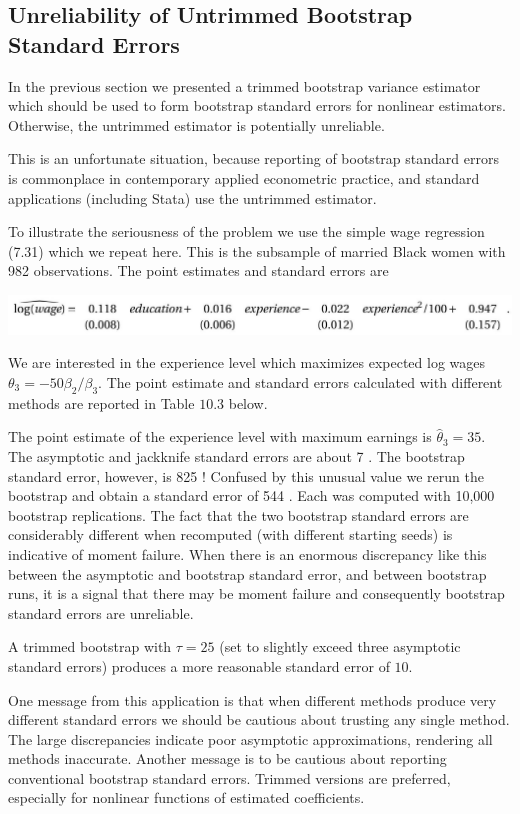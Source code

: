 \documentclass[10pt]{article}
\begin{document}
\subsection{Unreliability of Untrimmed Bootstrap Standard Errors}
In the previous section we presented a trimmed bootstrap variance estimator which should be used to form bootstrap standard errors for nonlinear estimators. Otherwise, the untrimmed estimator is potentially unreliable.

This is an unfortunate situation, because reporting of bootstrap standard errors is commonplace in contemporary applied econometric practice, and standard applications (including Stata) use the untrimmed estimator.

To illustrate the seriousness of the problem we use the simple wage regression (7.31) which we repeat here. This is the subsample of married Black women with 982 observations. The point estimates and standard errors are

\includegraphics[max width=\textwidth]{2022_09_17_704b7bd5000562ad7735g-21}

We are interested in the experience level which maximizes expected log wages $\theta_{3}=-50 \beta_{2} / \beta_{3}$. The point estimate and standard errors calculated with different methods are reported in Table $10.3$ below.

The point estimate of the experience level with maximum earnings is $\widehat{\theta}_{3}=35$. The asymptotic and jackknife standard errors are about 7 . The bootstrap standard error, however, is 825 ! Confused by this unusual value we rerun the bootstrap and obtain a standard error of 544 . Each was computed with 10,000 bootstrap replications. The fact that the two bootstrap standard errors are considerably different when recomputed (with different starting seeds) is indicative of moment failure. When there is an enormous discrepancy like this between the asymptotic and bootstrap standard error, and between bootstrap runs, it is a signal that there may be moment failure and consequently bootstrap standard errors are unreliable.

A trimmed bootstrap with $\tau=25$ (set to slightly exceed three asymptotic standard errors) produces a more reasonable standard error of $10 .$

One message from this application is that when different methods produce very different standard errors we should be cautious about trusting any single method. The large discrepancies indicate poor asymptotic approximations, rendering all methods inaccurate. Another message is to be cautious about reporting conventional bootstrap standard errors. Trimmed versions are preferred, especially for nonlinear functions of estimated coefficients.
\end{document}

